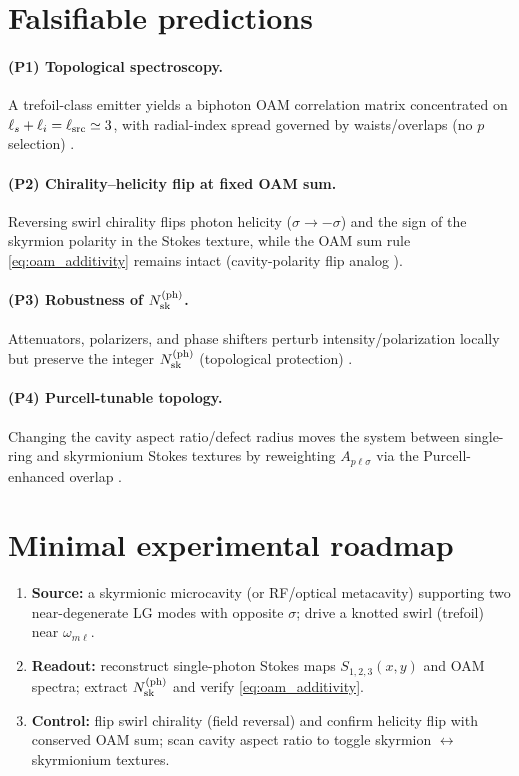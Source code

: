 \documentclass[12pt]{article}
\begin{document}
\section{Falsifiable predictions}

\paragraph{(P1) Topological spectroscopy.} A trefoil-class emitter yields a biphoton OAM correlation matrix concentrated on $\ell_s+\ell_i=\ell_{\rm src}\simeq 3$, with radial-index spread governed by waists/overlaps (no $p$ selection) \cite{Walborn2010SPDCReview,Kopf2025OAMConservation}.

\paragraph{(P2) Chirality--helicity flip at fixed OAM sum.} Reversing swirl chirality flips photon helicity ($\sigma\to-\sigma$) and the sign of the skyrmion polarity in the Stokes texture, while the OAM sum rule \eqref{eq:oam_additivity} remains intact (cavity-polarity flip analog \cite{Ma2025NanoPhotonSkyrmions}).

\paragraph{(P3) Robustness of $N_{\rm sk}^{(\mathrm{ph})}$.} Attenuators, polarizers, and phase shifters perturb intensity/polarization locally but preserve the integer $N_{\rm sk}^{(\mathrm{ph})}$ (topological protection) \cite{Ma2025NanoPhotonSkyrmions}.

\paragraph{(P4) Purcell-tunable topology.} Changing the cavity aspect ratio/defect radius moves the system between single-ring and skyrmionium Stokes textures by reweighting ${A_{p\ell\sigma}}$ via the Purcell-enhanced overlap \cite{Purcell1946,Ma2025NanoPhotonSkyrmions}.

\section{Minimal experimental roadmap}

\begin{enumerate}
\item \textbf{Source:} a skyrmionic microcavity (or RF/optical metacavity) supporting two near-degenerate LG modes with opposite $\sigma$; drive a knotted swirl (trefoil) near $\omega_{m\ell}$.
\item \textbf{Readout:} reconstruct single-photon Stokes maps $S_{1,2,3}(x,y)$ and OAM spectra; extract $N_{\rm sk}^{(\mathrm{ph})}$ and verify \eqref{eq:oam_additivity}.
\item \textbf{Control:} flip swirl chirality (field reversal) and confirm helicity flip with conserved OAM sum; scan cavity aspect ratio to toggle skyrmion $\leftrightarrow$ skyrmionium textures.
\end{enumerate}
\end{document}
